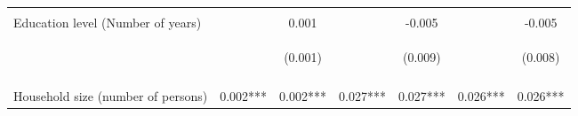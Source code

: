 \begin{center}
\begin{tabular}{lcccccc}
\vspace{4pt} & \begin{footnotesize}\end{footnotesize} & \begin{footnotesize}[0.481]\end{footnotesize} & \begin{footnotesize}\end{footnotesize} & \begin{footnotesize}[0.611]\end{footnotesize} & \begin{footnotesize}\end{footnotesize} & \begin{footnotesize}[0.533]\end{footnotesize} \\
Education level (Number of years) &  & 0.001 &  & -0.005 &  & -0.005 \\
 & \begin{footnotesize}\end{footnotesize} & \begin{footnotesize}(0.001)\end{footnotesize} & \begin{footnotesize}\end{footnotesize} & \begin{footnotesize}(0.009)\end{footnotesize} & \begin{footnotesize}\end{footnotesize} & \begin{footnotesize}(0.008)\end{footnotesize} \\
\vspace{4pt} & \begin{footnotesize}\end{footnotesize} & \begin{footnotesize}[0.601]\end{footnotesize} & \begin{footnotesize}\end{footnotesize} & \begin{footnotesize}[0.603]\end{footnotesize} & \begin{footnotesize}\end{footnotesize} & \begin{footnotesize}[0.533]\end{footnotesize} \\
Household size (number of persons) & 0.002*** & 0.002*** & 0.027*** & 0.027*** & 0.026*** & 0.026*** \\

\end{tabular}
\end{center}

